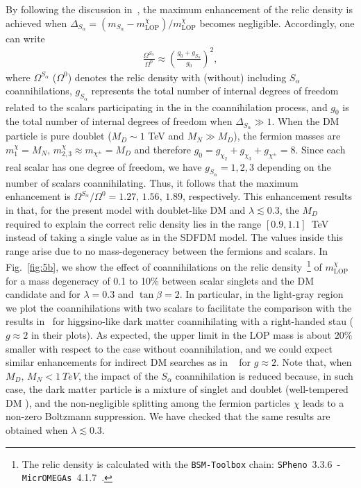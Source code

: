 By following the discussion in~\cite{Klasen:2013jpa}, the maximum
enhancement of the relic density is achieved when
$\Delta_{S_\alpha}=(m_{S_{\alpha}}-m_{\text{LOP}}^{\chi})/m_{\text{LOP}}^{\chi}$
becomes negligible. 
Accordingly, one can write
\begin{align}
\frac{  \Omega^{S_{\alpha}}}{\Omega^{0}}\approx\left( \frac{g_0+g_{S_{\alpha}}}{g_0} \right)^2,
\end{align}
where $\Omega^{S_{\alpha}}$ ($\Omega^{0}$) denotes the relic density
with (without) including $S_{\alpha}$ coannihilations,
$g_{S_{\alpha}}$ represents the total number of internal degrees of
freedom related to the scalars participating in the in the
coannihilation process, and $g_{0}$ is the total number of internal
degrees of freedom when $\Delta_{S_\alpha}\gg1$. 
When the DM particle is pure doublet ($M_D\sim1$ TeV and $M_N\gg M_D$),
the fermion masses are $m_1^{\chi}=M_N,\,m_{2,3}^{\chi}\approx
m_{\chi^\pm}=M_D$ and therefore
$g_{0}=g_{\chi_2}+g_{\chi_3}+g_{\chi^\pm}=8$.
Since each real scalar has one degree of freedom, we have
$g_{S_{\alpha}}=1,2,3$ depending on the number of scalars
coannihilating. Thus, it follows that the maximum enhancement is
$\Omega^{S_{\alpha}}/\Omega^{0}=1.27,\, 1.56,\,1.89$, respectively. 
This enhancement results in that, for the present model with
doublet-like DM and $\lambda\lesssim0.3$, the $M_D$ required to explain
the correct relic density lies in the range $[0.9,1.1]$~TeV instead of
taking a single value as in the SDFDM model.  
The values inside this range arise due to no mass-degeneracy
between the fermions and scalars. 
In Fig.~\ref{fig:5b}, we show the effect of coannihilations on the
relic density~\footnote{The relic density is calculated with the
  \texttt{BSM-Toolbox} chain: 
\texttt{SPheno}~3.3.6~\cite{Porod:2011nf}-\texttt{MicrOMEGAs}~4.1.7~\cite{Belanger:2006is,Belanger:2014vza}.}
of $m_{\text{LOP}}^{\chi}$ for a mass degeneracy of 0.1
to 10\% between  scalar singlets and the DM candidate and for
$\lambda=0.3$ and $\tan\beta=2$. 
In particular, in the light-gray region we plot the coannihilations
with two scalars to facilitate the comparison with the results
in~\cite{Profumo:2006bx} for higgsino-like dark matter coannihilating
with a right-handed stau ($g\approx 2$ in their plots).
As expected, the upper limit in the LOP mass is about $20\%$ smaller
with respect to the case without coannihilation, and we could 
expect similar enhancements for indirect DM searches
as  in ~\cite{Profumo:2006bx} for $g\approx 2$.
Note that, when $M_D,\,M_N<\SI{1}{TeV}$, the impact of the $S_\alpha$ coannihilation is reduced because, in such case, the
dark matter particle is a mixture of singlet and doublet
(well-tempered DM \cite{ArkaniHamed:2006mb}), and the non-negligible
splitting among the fermion particles $\chi$ leads to a non-zero
Boltzmann suppression. 
We have checked that the same results are obtained when
$\lambda\lesssim0.3$.

